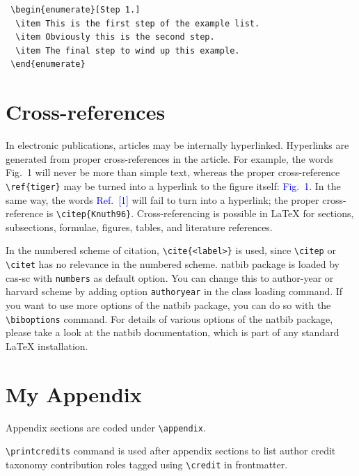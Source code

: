 \documentclass[a4paper,fleqn]{cas-sc}
\begin{document}
\begin{verbatim}
 \begin{enumerate}[Step 1.]
  \item This is the first step of the example list.
  \item Obviously this is the second step.
  \item The final step to wind up this example.
 \end{enumerate}
\end{verbatim}

\section{Cross-references}
In electronic publications, articles may be internally
hyperlinked. Hyperlinks are generated from proper
cross-references in the article.  For example, the words
\textcolor{black!80}{Fig.~1} will never be more than simple text,
whereas the proper cross-reference \verb+\ref{tiger}+ may be
turned into a hyperlink to the figure itself:
\textcolor{blue}{Fig.~1}.  In the same way,
the words \textcolor{blue}{Ref.~[1]} will fail to turn into a
hyperlink; the proper cross-reference is \verb+\citep{Knuth96}+.
Cross-referencing is possible in \LaTeX{} for sections,
subsections, formulae, figures, tables, and literature
references.

In the numbered scheme of citation, \verb+\cite{<label>}+ is used,
since \verb+\citep+ or \verb+\citet+ has no relevance in the numbered
scheme.  {natbib} package is loaded by {cas-sc} with
\verb+numbers+ as default option.  You can change this to author-year
or harvard scheme by adding option \verb+authoryear+ in the class
loading command.  If you want to use more options of the {natbib}
package, you can do so with the \verb+\biboptions+ command.  For
details of various options of the {natbib} package, please take a
look at the {natbib} documentation, which is part of any standard
\LaTeX{} installation.

\appendix
\section{My Appendix}
Appendix sections are coded under \verb+\appendix+.

\verb+\printcredits+ command is used after appendix sections to list 
author credit taxonomy contribution roles tagged using \verb+\credit+ 
in frontmatter.

\printcredits

% 



\end{document}
